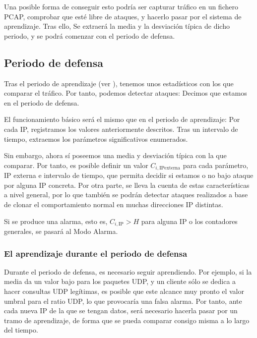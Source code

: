 Una posible forma de conseguir esto podría ser capturar tráfico en un fichero \gls{PCAP}, comprobar que esté libre de 
ataques, y hacerlo pasar por el sistema de aprendizaje. Tras ello, Se extraerá la media y la desviación típica de dicho 
periodo, y se podrá comenzar con el periodo de defensa.

\subsection{Periodo de defensa}
Tras el periodo de aprendizaje (ver ), tenemos unos estadísticos con los que comparar el 
tráfico. Por tanto, podemos detectar ataques: Decimos que estamos en el periodo de defensa.

El funcionamiento básico será el mismo que en el periodo de aprendizaje: Por cada \gls{IP}, registramos los valores 
anteriormente descritos. Tras un intervalo de tiempo, extraemos los parámetros significativos enumerados.

Sin embargo, ahora sí poseemos una media y desviación típica con la que comparar. Por tanto, es posible definir un 
valor $C_{i,\text{IPexterna}}$ para cada parámetro, IP externa e intervalo de tiempo, que permita decidir si estamos o 
no bajo ataque por alguna IP concreta. Por otra parte, se lleva la cuenta de estas características a nivel general, por 
lo que también se podrán detectar ataques realizados a base de clonar el comportamiento normal en muchas direcciones 
\gls{IP} distintas.

Si se produce una alarma, esto es, $C_{i,\text{IP}} > H$ para alguna \gls{IP} o los contadores generales, se pasará al 
Modo Alarma. 

\subsubsection{El aprendizaje durante el periodo de defensa}

Durante el periodo de defensa, es necesario seguir aprendiendo. Por ejemplo, si la media da un valor bajo para los 
paquetes \gls{UDP}, y un cliente sólo se dedica a hacer consultas \gls{UDP} legítimas, es posible que este alcance muy 
pronto el valor umbral para el ratio \gls{UDP}, lo que provocaría una falsa alarma. Por tanto, ante cada nueva IP de la 
que se tengan datos, será necesario hacerla pasar por un tramo de aprendizaje, de forma que se pueda comparar consigo 
misma a lo largo del tiempo.

